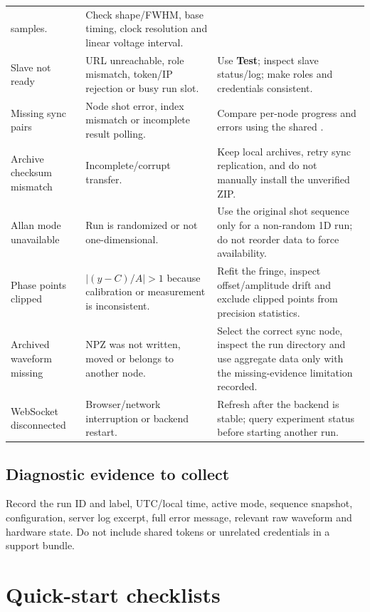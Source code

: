 \documentclass[11pt,oneside,openany]{book}
\newcommand{\code}[1]{\texttt{\detokenize{#1}}}
\newcommand{\ui}[1]{\textbf{#1}}
\begin{document}
\begin{longtable}{p{} p{} p{}}
samples. & Check shape/FWHM, base timing, clock resolution and linear voltage interval.\\
Slave not ready & URL unreachable, role mismatch, token/IP rejection or busy run slot. &
Use \ui{Test}; inspect slave status/log; make roles and credentials consistent.\\
Missing sync pairs & Node shot error, index mismatch or incomplete result polling. & Compare
per-node progress and errors using the shared \code{sync_shot_index}.\\
Archive checksum mismatch & Incomplete/corrupt transfer. & Keep local archives, retry sync
replication, and do not manually install the unverified ZIP.\\
Allan mode unavailable & Run is randomized or not one-dimensional. & Use the original shot
sequence only for a non-random 1D run; do not reorder data to force availability.\\
Phase points clipped & $|(y-C)/A|>1$ because calibration or measurement is inconsistent. &
Refit the fringe, inspect offset/amplitude drift and exclude clipped points from precision
statistics.\\
Archived waveform missing & NPZ was not written, moved or belongs to another node. & Select
the correct sync node, inspect the run directory and use aggregate data only with the
missing-evidence limitation recorded.\\
WebSocket disconnected & Browser/network interruption or backend restart. & Refresh after
the backend is stable; query experiment status before starting another run.\\
\bottomrule
\end{longtable}
\normalsize

\section{Diagnostic evidence to collect}
Record the run ID and label, UTC/local time, active mode, sequence snapshot, configuration,
server log excerpt, full error message, relevant raw waveform and hardware state. Do not
include shared tokens or unrelated credentials in a support bundle.

\appendix

\chapter{Quick-start checklists}
\end{document}
